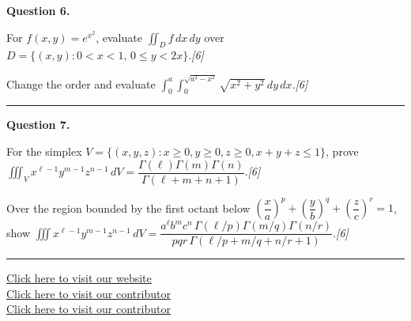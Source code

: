 \documentclass[11pt,a4paper]{article}
\newcommand{\pts}[1]{\hfill   \textit{[#1]}}
\begin{document}
\medskip


\noindent   \textbf{Question 6.}

\begin{parts}
  \item For $f(x,y)=e^{x^2}$, evaluate $\displaystyle\iint_D f\,dx\,dy$ over $D=\{(x,y):0<x<1,\,0\leq y<2x\}$.\pts{6}
  \item Change the order and evaluate $\displaystyle\int_0^a\!\int_0^{\sqrt{a^2-x^2}}\sqrt{x^2+y^2}\,dy\,dx$.\pts{6}
\end{parts}
\medskip\rule{\linewidth}{0.2pt}

\medskip


\noindent   \textbf{Question 7.}

\begin{parts}
  \item For the simplex $V=\{(x,y,z):x\geq0,y\geq0,z\geq0,x+y+z\leq1\}$, prove $\displaystyle\iiint_V x^{\ell-1}y^{m-1}z^{n-1}\,dV=\dfrac{\Gamma(\ell)\Gamma(m)\Gamma(n)}{\Gamma(\ell+m+n+1)}$.\pts{6}
  \item Over the region bounded by the first octant below $\left(\dfrac{x}{a}\right)^p+\left(\dfrac{y}{b}\right)^q+\left(\dfrac{z}{c}\right)^r=1$, show $\displaystyle\iiint x^{\ell-1}y^{m-1}z^{n-1}\,dV=\dfrac{a^\ell b^m c^n\,\Gamma(\ell/p)\Gamma(m/q)\Gamma(n/r)}{pqr\,\Gamma(\ell/p+m/q+n/r+1)}$.\pts{6}
\end{parts}

\vfill\rule{\linewidth}{0.4pt}

\begin{center}\small
\href{https://bhu-exam.vercel.app/}{Click here to visit our website}\\[4pt]
\href{https://me-aryan.vercel.app/}{Click here to visit our contributor}\\[4pt]
\href{https://quashan-me.vercel.app/}{Click here to visit our contributor}
\end{center}
\end{document}
